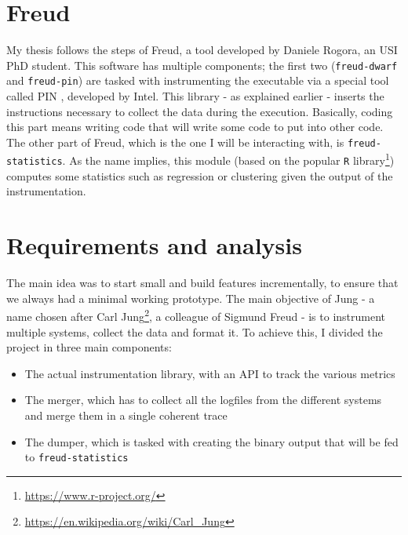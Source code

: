     \section{Freud}\label{sec:freud}


        My thesis follows the steps of Freud, a tool developed by Daniele Rogora, an USI PhD student.
        This software has multiple components; the first two (\texttt{freud-dwarf} and \texttt{freud-pin})
        are tasked with instrumenting the executable 
        via a special tool called PIN \cite{pin}, developed by Intel. This library - as explained earlier - 
        inserts the instructions necessary to collect the data during the execution. Basically, coding this
        part means writing code that will write some code to put into other code.\\

        The other part of Freud, which is the one I will be interacting with, is \texttt{freud-statistics}.
        As the name implies, this module (based on the popular \texttt{R} library\footnote{\url{https://www.r-project.org/}})
        computes some statistics such as regression or clustering given the output of the instrumentation.


    \section{Requirements and analysis}


        The main idea was to start small and build features incrementally, to ensure that we always
        had a minimal working prototype. The main objective of Jung - a name chosen after Carl
        Jung\footnote{\url{https://en.wikipedia.org/wiki/Carl_Jung}},
        a colleague of Sigmund Freud - is to instrument multiple systems, collect the data and format it.
        To achieve this, I divided the project in three main components:

        \begin{itemize}
            \item The actual instrumentation library, with an API to track the various metrics
            \item The merger, which has to collect all the logfiles from the different systems
             and merge them in a single coherent trace
            \item The dumper, which is tasked with creating the binary output that will be fed
             to \texttt{freud-statistics}
        \end{itemize}

